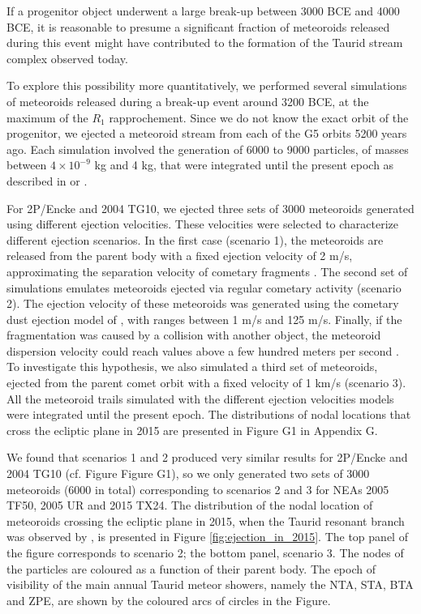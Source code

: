 \documentclass[letters,a4paper,fleqn,usenatbib]{mnras}
\begin{document}
If a progenitor object underwent a large break-up between 3000 BCE and 4000 BCE, it is reasonable to presume a significant fraction of meteoroids released during this event might have contributed to the formation of the Taurid stream complex observed today. 

To explore this possibility more quantitatively, we performed several simulations of meteoroids released during a break-up event around 3200 BCE, at the maximum of the $R_1$ rapprochement. Since we do not know the exact orbit of the progenitor, we ejected a meteoroid stream from each of the G5 orbits 5200 years ago. Each simulation involved the generation of 6000 to 9000 particles, of masses between $4\times10^{-9}$ kg and 4 kg, that were integrated until the present epoch as described in \cite{Egal2019} or \cite{Egal2020}.

For 2P/Encke and 2004 TG10, we ejected three sets of 3000 meteoroids generated using different ejection velocities. These velocities were selected to characterize different ejection scenarios. In the first case (scenario 1), the meteoroids are released from the parent body with a fixed ejection velocity of 2 m/s, approximating the separation velocity of cometary fragments \citep{Boehnhardt2004}. The second set of simulations emulates meteoroids ejected via regular cometary activity (scenario 2).
 The ejection velocity of these meteoroids was generated using the cometary dust ejection model of \cite{Crifo1997}, with ranges between 1 m/s and 125 m/s. Finally, if the fragmentation was caused by a collision with another object, the meteoroid dispersion velocity could reach values above a few hundred meters per second \citep{Hyodo2020}. To investigate this hypothesis, we also simulated a third set of meteoroids, ejected from the parent comet orbit with a fixed velocity of 1 km/s (scenario 3). All the meteoroid trails simulated with the different ejection velocities models were integrated until the present epoch. The distributions of nodal locations that cross the ecliptic plane in 2015 are presented in Figure G1 in Appendix G.
 
 We found that scenarios 1 and 2 produced very similar results for 2P/Encke and 2004 TG10 (cf. Figure Figure G1), so we only generated two sets of 3000 meteoroids (6000 in total) corresponding to scenarios 2 and 3 for NEAs 2005 TF50, 2005 UR and 2015 TX24. The distribution of the nodal location of meteoroids crossing the ecliptic plane in 2015, when the Taurid resonant branch was observed by \cite{Spurny2017}, is presented in Figure \ref{fig:ejection_in_2015}. The top panel of the figure corresponds to scenario 2; the bottom panel, scenario 3. The nodes of the particles are coloured as a function of their parent body. The epoch of visibility of the main annual Taurid meteor showers, namely the NTA, STA, BTA and ZPE, are shown by the coloured arcs of circles in the Figure. 
 
\end{document}
